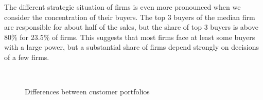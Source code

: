 \documentclass[final, dvipsnames, authoryear,12pt]{elsarticle}
\begin{document}
The different strategic situation of firms is even more pronounced when we consider the concentration of their buyers. The top 3 buyers of the median firm are responsible for about half of the sales, but the share of top 3 buyers is above 80\% for 23.5\% of firms. This suggests that most firms face at least some buyers with a large power, but a substantial share of firms depend strongly on decisions of a few firms.

\begin{figure}[!h]
    \caption{Differences between customer portfolios}
    \label{fig:happy_few}
    \begin{center}
    \\

\end{center}
\end{figure}
\end{document}
